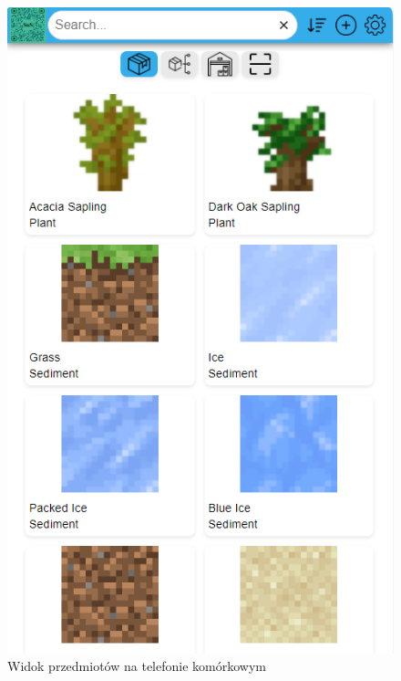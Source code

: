 \documentclass[../main.tex]{subfiles}
\begin{document}
            \begin{figure}[H]
                \centering
                \includegraphics[height=\getImageHeight]{images/app-mobile/app-items-mobile.png}
                \caption{Widok przedmiotów na telefonie komórkowym}
                \label{fig:app-items-mobile}
            \end{figure}
\end{document}
